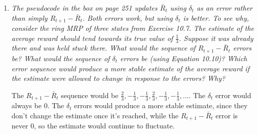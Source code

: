 \documentclass[12pt,a4paper]{article}
\begin{document}
\begin{enumerate}
  \item \textit{The pseudocode in the box on page 251 updates $\bar{R}_t$ using $\delta_t$
  as an error rather than simply $R_{t + 1} - \bar{R}_t$. Both errors work, but using
  $\delta_t$ is better. To see why, consider the ring MRP of three states from
  Exercise 10.7. The estimate of the average reward should tend towards its true
  value of $\frac{1}{3}$. Suppose it was already there and was
  held stuck there. What would the sequence of $R_{t + 1} - \bar{R}_t$ errors be?
  What would the sequence of $\delta_t$ errors be (using Equation 10.10)? Which error
  sequence would produce a more stable estimate of the average reward if the estimate
  were allowed to change in response to the errors? Why?}

  The $R_{t + 1} - \bar{R}_t$ sequence would be $\frac{2}{3}, -\frac{1}{3},-\frac{1}{3},
  \frac{2}{3}, -\frac{1}{3}, -\frac{1}{3}, \dots$. The $\delta_t$ error would always
  be $0$. The $\delta_t$ errors would produce a more stable estimate, since they don't
  change the estimate once it's reached, while the $R_{t + 1} - \bar{R}_t$ error is never
  $0$, so the estimate would continue to fluctuate.
\end{enumerate}
\end{document}
